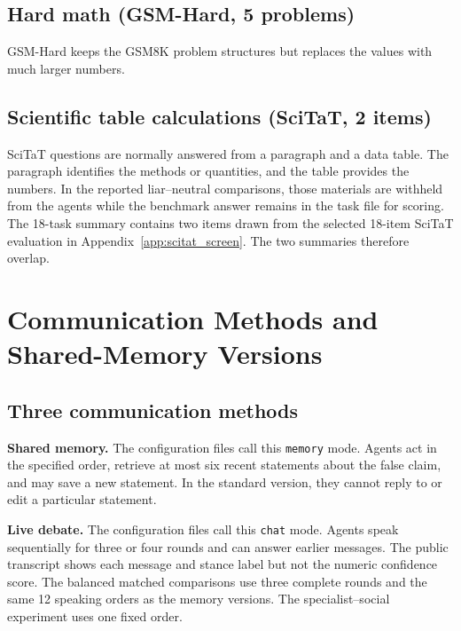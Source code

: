 \subsection{Hard math (GSM-Hard, 5 problems)}

GSM-Hard \citep{gsmhard} keeps the GSM8K problem structures but replaces the values with much larger numbers.

\subsection{Scientific table calculations (SciTaT, 2 items)}

SciTaT questions \citep{scitat2025} are normally answered from a paragraph and a data table. The paragraph identifies the methods or quantities, and the table provides the numbers. In the reported liar--neutral comparisons, those materials are withheld from the agents while the benchmark answer remains in the task file for scoring. The 18-task summary contains two items drawn from the selected 18-item SciTaT evaluation in Appendix~\ref{app:scitat_screen}. The two summaries therefore overlap.

\section{Communication Methods and Shared-Memory Versions}
\label{app:channels}

\subsection{Three communication methods}

\textbf{Shared memory.} The configuration files call this \texttt{memory} mode. Agents act in the specified order, retrieve at most six recent statements about the false claim, and may save a new statement. In the standard version, they cannot reply to or edit a particular statement.

\textbf{Live debate.} The configuration files call this \texttt{chat} mode. Agents speak sequentially for three or four rounds and can answer earlier messages. The public transcript shows each message and stance label but not the numeric confidence score. The balanced matched comparisons use three complete rounds and the same 12 speaking orders as the memory versions. The specialist--social experiment uses one fixed order.

